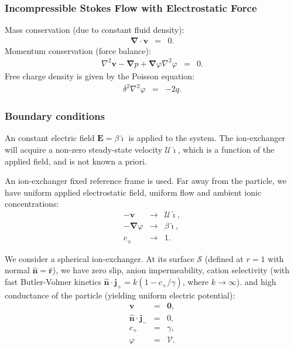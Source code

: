 \documentclass[final]{elsarticle}
\newcommand\Laplacian{\nabla^2}
\newcommand\bnabla{\boldsymbol{\nabla}}
\newcommand\bv{\boldsymbol{v}}
\newcommand\bE{\boldsymbol{E}}
\newcommand\bn{\boldsymbol{\hat{n}}}
\newcommand\bj{\boldsymbol{j}}
\newcommand\br{\boldsymbol{r}}
\newcommand\brhat{\hat{\br}}
\newcommand\bzero{\boldsymbol{0}}
\newcommand\cU{\mathscr{U}}
\newcommand\cV{\mathscr{V}}
\newcommand\ui{\boldsymbol{\hat{\imath}}}
\begin{document}
\subsubsection{Incompressible Stokes Flow with Electrostatic Force}
Mass conservation (due to constant fluid density):
\begin{eqnarray*}
\bnabla \cdot \bv &=& 0.
\end{eqnarray*}
Momentum conservation (force balance):
\begin{eqnarray*}
\Laplacian \bv - \bnabla p + \bnabla \varphi \Laplacian \varphi &=& 0.
\end{eqnarray*}
Free charge density is given by the Poisson equation:
\begin{eqnarray*}
\delta^2 \Laplacian \varphi &=& -2q.
\end{eqnarray*}

\subsubsection{Boundary conditions}
An constant electric field $\bE = \beta \ui$ is applied to the system.
The ion-exchanger will acquire a non-zero steady-state velocity $\cU \ui$, which is
a function of the applied field, and is not known a priori.

An ion-exchanger fixed reference frame is used.
Far away from the particle, we have uniform applied electrostatic field, uniform flow
and ambient ionic concentrations:
\begin{eqnarray*}
-\bv &\rightarrow& \cU \ui, \\
-\bnabla \varphi &\rightarrow& \beta\ui, \\
c_\pm &\rightarrow& 1.
\end{eqnarray*}

We consider a spherical ion-exchanger. 
At its surface $\mathcal{S}$ (defined at $r=1$ with normal $\bn = \brhat$), 
we have zero slip, anion impermeability, cation selectivity 
(with fast Butler-Volmer\cite{bard2000book} kinetics
$\bn \cdot \bj_+ = k (1 - c_+/\gamma)$, where $k \rightarrow \infty$).
and high conductance of the particle (yielding uniform electric potential):
\begin{eqnarray*}
\bv & = & \bzero, \\
\bn \cdot \bj_- & = & 0, \\
c_+ &=& \gamma, \\
\varphi & = & \cV.
\end{eqnarray*}

\end{document}
